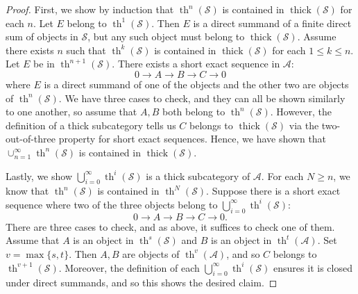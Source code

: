 \documentclass[11pt]{amsart}
\theoremstyle{plain}
\theoremstyle{definition}
\numberwithin{equation}{section}
\numberwithin{theorem}{section}
\begin{document}
\begin{proof}
    First, we show by induction that $\operatorname{th}^n (\mathcal{S})$ is contained in $\operatorname{thick}(\mathcal{S})$ for each $n$. Let $E$ belong to $\operatorname{th}^1 (\mathcal{S})$. Then $E$ is a direct summand of a finite direct sum of objects in $\mathcal{S}$, but any such object must belong to $\operatorname{thick}(\mathcal{S})$. Assume there exists $n$ such that $\operatorname{th}^k (\mathcal{S})$ is contained in $\operatorname{thick}(\mathcal{S})$ for each $1 \leq k \leq n$. Let $E$ be in $\operatorname{th}^{n+1}(\mathcal{S})$. There exists a short exact sequence in $\mathcal{A}$:
    \begin{displaymath}
        0 \to A\to B \to C \to 0
    \end{displaymath}
    where $E$ is a direct summand of one of the objects and the other two are objects of $\operatorname{th}^n (\mathcal{S})$. We have three cases to check, and they can all be shown similarly to one another, so assume that $A,B$ both belong to $\operatorname{th}^n (\mathcal{S})$. However, the definition of a thick subcategory tells us $C$ belongs to $\operatorname{thick}(\mathcal{S})$ via the two-out-of-three property for short exact sequences. Hence, we have shown that $\cup^\infty_{n=1} \operatorname{th}^n (\mathcal{S})$ is contained in $\operatorname{thick}(\mathcal{S})$.
    
    Lastly, we show $\bigcup^\infty_{i=0} \operatorname{th}^i (\mathcal{S})$ is a thick subcategory of $\mathcal{A}$. For each $N\geq n$, we know that $\operatorname{th}^n (\mathcal{S})$ is contained in $\operatorname{th}^N (\mathcal{S})$. Suppose there is a short exact sequence where two of the three objects belong to $\bigcup^\infty_{i=0} \operatorname{th}^i (\mathcal{S})$:
    \begin{displaymath}
        0 \to A \to B \to C \to 0.
    \end{displaymath}
    There are three cases to check, and as above, it suffices to check one of them. Assume that $A$ is an object in $\operatorname{th}^s (\mathcal{S})$ and $B$ is an object in $\operatorname{th}^t (\mathcal{A})$. Set $v = \max\{ s,t\}$. Then $A,B$ are objects of $\operatorname{th}^v (\mathcal{A})$, and so $C$ belongs to $\operatorname{th}^{v+1} (\mathcal{S})$. Moreover, the definition of each $\bigcup^\infty_{i=0} \operatorname{th}^i (\mathcal{S})$ ensures it is closed under direct summands, and so this shows the desired claim.
\end{proof}
\end{document}
